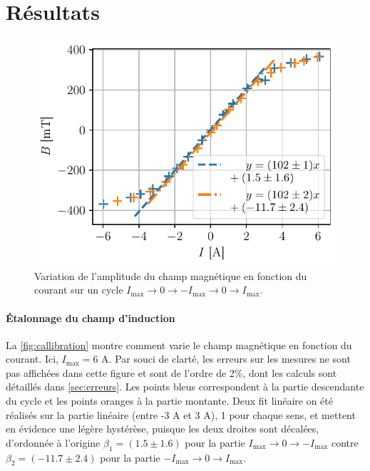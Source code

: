 \section{Résultats}

\begin{minipage}{\textwidth}
    \begin{figure}
        \includegraphics[width=\linewidth]{figures/calibration.pdf}
        \caption{Variation de l'amplitude du champ magnétique en fonction du courant sur un cycle \(I_\textrm{max} \rightarrow 0 \rightarrow -I_\textrm{max} \rightarrow 0 \rightarrow I_\textrm{max}\).}
        \label{fig:callibration}
    \end{figure}

    \paragraph*{Étalonnage du champ d'induction}
    La \autoref{fig:callibration} montre comment varie le champ magnétique en fonction du courant. Ici, \(I_\textrm{max} = 6\) \si{\ampere}. Par souci de clarté, les erreurs sur les mesures ne sont pas affichées dans cette figure et sont de l'ordre de 2\%, dont les calculs sont détaillés dans \autoref{sec:erreurs}. Les points bleus correspondent à la partie descendante du cycle et les points oranges à la partie montante. Deux fit linéaire on été réalisés sur la partie linéaire (entre -3 \si{\ampere} et 3 \si{\ampere}), 1 pour chaque sens, et mettent en évidence une légère hystérèse, puisque les deux droites sont décalées, d'ordonnée à l'origine \(\beta_1 = (1.5 \pm 1.6)\) pour la partie \(I_\textrm{max} \rightarrow 0 \rightarrow -I_\textrm{max}\) contre \(\beta_2 = (-11.7 \pm 2.4)\) pour la partie \(-I_\textrm{max} \rightarrow 0 \rightarrow I_\textrm{max}\).

\end{minipage}

